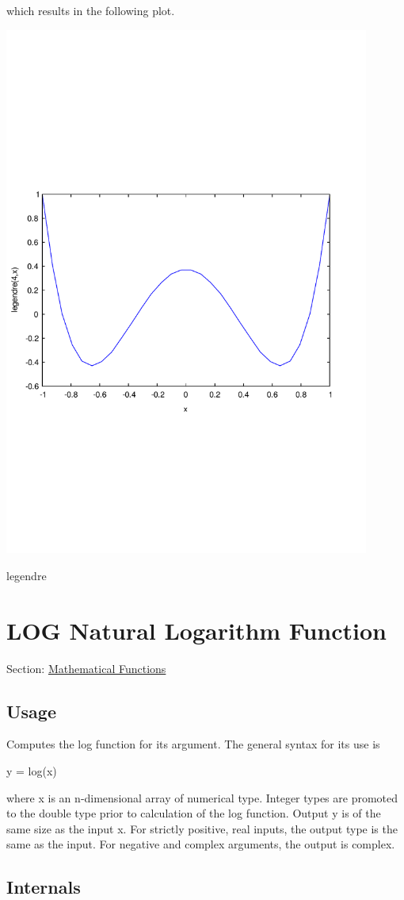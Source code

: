 which results in the following plot.  
\begin{DoxyImage}
\includegraphics[width=12cm]{legendre}
\caption{legendre}
\end{DoxyImage}
 \hypertarget{mathfunctions_log}{}\section{L\-O\-G Natural Logarithm Function}\label{mathfunctions_log}
Section\-: \hyperlink{sec_mathfunctions}{Mathematical Functions} \hypertarget{vtkwidgets_vtkxyplotwidget_Usage}{}\subsection{Usage}\label{vtkwidgets_vtkxyplotwidget_Usage}
Computes the {\ttfamily log} function for its argument. The general syntax for its use is \begin{DoxyVerb}  y = log(x)
\end{DoxyVerb}
 where {\ttfamily x} is an {\ttfamily n}-\/dimensional array of numerical type. Integer types are promoted to the {\ttfamily double} type prior to calculation of the {\ttfamily log} function. Output {\ttfamily y} is of the same size as the input {\ttfamily x}. For strictly positive, real inputs, the output type is the same as the input. For negative and complex arguments, the output is complex. \hypertarget{transforms_svd_Function}{}\subsection{Internals}\label{transforms_svd_Function}
